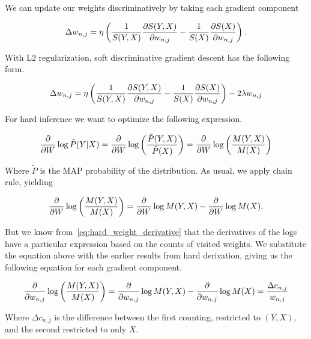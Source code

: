 We can update our weights discriminatively by taking each gradient component

\begin{equation*}
  \Delta w_{n,j}=\eta\left(\frac{1}{S(Y,X)}\frac{\partial S(Y,X)}{\partial w_{n,j}}-\frac{1}{S(X)}
    \frac{\partial S(X)}{\partial w_{n,j}}\right).
\end{equation*}

With L2 regularization, soft discriminative gradient descent has the following form.

\begin{equation}
  \Delta w_{n,j}=\eta\left(\frac{1}{S(Y,X)}\frac{\partial S(Y,X)}{\partial w_{n,j}}-\frac{1}{S(X)}
    \frac{\partial S(X)}{\partial w_{n,j}}\right)-2\lambda w_{n,j}
\end{equation}

For hard inference we want to optimize the following expression.

\begin{equation*}
  \frac{\partial}{\partial W}\log\tilde{P}(Y|X)=\frac{\partial}{\partial W}\log\left(\frac{\tilde{P}(Y,X)}{\tilde{P}(X)}\right)=
    \frac{\partial}{\partial W}\log\left(\frac{M(Y,X)}{M(X)}\right)
\end{equation*}

Where $\tilde{P}$ is the MAP probability of the distribution. As usual, we apply chain rule,
yielding

\begin{equation*}
  \frac{\partial}{\partial W}\log\left(\frac{M(Y,X)}{M(X)}\right)=\frac{\partial}{\partial W}\log M(Y,X)-\frac{\partial}{\partial W}\log M(X).
\end{equation*}

But we know from~\autoref{eq:hard_weight_derivative} that the derivatives of the logs have a
particular expression based on the counts of visited weights. We substitute the equation above with
the earlier results from hard derivation, giving us the following equation for each gradient
component.

\begin{equation*}
  \frac{\partial}{\partial w_{n,j}}\log\left(\frac{M(Y,X)}{M(X)}\right)=\frac{\partial}{\partial w_{n,j}}\log M(Y,X)-
  \frac{\partial}{\partial w_{n,j}}\log M(X)=\frac{\Delta c_{n,j}}{w_{n,j}}
\end{equation*}

Where $\Delta c_{n,j}$ is the difference between the first counting, restricted to $(Y,X)$, and the
second restricted to only $X$.

